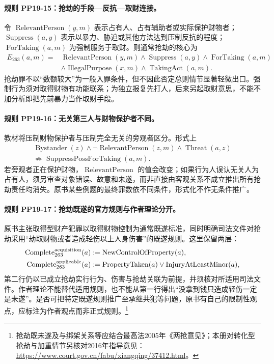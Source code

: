 \paragraph{规则 PP19-15：抢劫的手段—反抗—取财连接。}
\mbox{}\par
令 $\operatorname{RelevantPerson}(y,m)$ 表示占有人、占有辅助者或实际保护财物者；$\operatorname{Suppress}(a,y)$ 表示以暴力、胁迫或其他方法达到压制反抗的程度；$\operatorname{ForTaking}(a,m)$ 为强制服务于取财。则通常抢劫的核心为
\[
\begin{aligned}
E_{263}(a,m)={}&\operatorname{RelevantPerson}(y,m)
\land\operatorname{Suppress}(a,y)
\land\operatorname{ForTaking}(a,m)\\
&\land\operatorname{IllegalPurpose}(x,m)
\land\operatorname{TakingAct}(a,m).
\end{aligned}
\]
抢劫罪不以“数额较大”为一般入罪条件，但不因此否定总则情节显著轻微出口。强制行为须对取得财物有功能联系；为独立报复先打人，后来另起取财意思，不能不加分析即把先前暴力当作取财手段。

\paragraph{规则 PP19-16：无关第三人与财物保护者不同。}
\mbox{}\par
教材将压制财物保护者与压制完全无关的旁观者区分。形式上
\[
\begin{gathered}
\operatorname{Bystander}(z)\land\neg\operatorname{RelevantPerson}(z,m)
\land\operatorname{Threat}(a,z)\\
\not\Rightarrow\operatorname{SuppressPossForTaking}(a,m).
\end{gathered}
\]
若旁观者正在保护财物，$\operatorname{RelevantPerson}$ 的值会改变；如果行为人误认无关人为占有人，须另审查对象错误、故意和未遂，而非直接由客观关系不成立推出所有抢劫责任均消失。原书某些例题的最终罪数依不同条件，形式化不作无条件推广。

\paragraph{规则 PP19-17：抢劫既遂的官方规则与作者理论分开。}
\mbox{}\par
原书主张取得型财产犯罪以取得财物控制为通常既遂标准，同时明确司法文件对抢劫采用“劫取财物或者造成轻伤以上人身伤害”的既遂规则。这里保留两层：
\[
\begin{aligned}
\operatorname{Complete}^{\rm acquisition}_{263}(a)
&:=\operatorname{NewControlOfProperty}(a),\\
\operatorname{Complete}^{\rm applicable}_{263}(a)
&:=\operatorname{PropertyTaken}(a)
\lor\operatorname{InjuryAtLeastMinor}(a),
\end{aligned}
\]
第二行仍以已成立抢劫实行行为、伤害与抢劫关联为前提，并须核对所适用司法文件。作者理论不能替代适用规则，也不能从第一行得出“没拿到钱只造成轻伤一定是未遂”。是否可把特定既遂规则推广至承继共犯等问题，原书有自己的限制性观点，应标注为作者观点而非正式规则。\footnote{抢劫既未遂及与绑架关系等应结合最高法2005年《两抢意见》；本册对转化型抢劫与加重情节另核对2016年指导意见：\url{https://www.court.gov.cn/fabu/xiangqing/37412.html}。}

